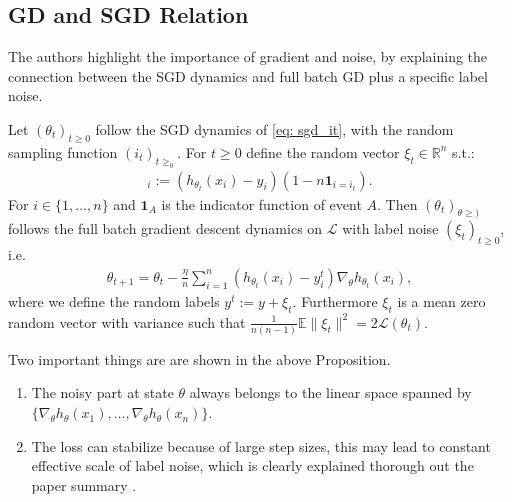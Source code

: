\subsection{GD and SGD Relation}
The authors highlight the importance of gradient and noise, by explaining the
connection between the SGD dynamics and full batch GD plus a specific label
noise.

\begin{proposition}
    Let $(\theta_t)_{t\ge 0 }$ follow the SGD dynamics of \ref{eq: sgd_it},
    with the random sampling function $(i_t)_{t\ge_0}$. For $t\ge 0$ define
    the random vector $\xi_t \in \mathbb{R}^{n}$ s.t.:
    \begin{align}
        [\xi_t]_i := (h_{\theta_t}(x_i) - y_i)(1-n\mathbf{1}_{i=i_t}).
    \end{align}
    For $i \in \{1,\ldots,n\}$ and $\mathbf{1}_{A}$ is the indicator function
    of event $A$. Then $(\theta_t)_{\theta\ge )}$ follows the full batch
    gradient descent dynamics on $\mathcal{L}$ with label noise
    $(\xi_t)_{t\ge 0}$, i.e.
    \begin{align}
        \theta_{t+1} = \theta_t - \frac{\eta}{n} \sum_{i=1}^{n}
        \left( h_{\theta_t}(x_i) - y_i^{t} \right)
        \nabla_{\theta}h_{\theta_t}(x_i),
    \end{align}
    where we define the random labels $y^{t} := y + \xi_t$. Furthermore
    $\xi_t$ is a mean zero random vector with variance such that
    $\frac{1}{n(n-1)}\mathbb{E}\|\xi_t\|^{2} = 2 \mathcal{L}(\theta_t)$.
\end{proposition}
Two important things are are shown in the above Proposition.
\begin{enumerate}
    \item The noisy part at state $\theta$ always belongs to the linear space
        spanned by $\{\nabla_\theta h_\theta(x_1),\ldots, \nabla_\theta
        h_\theta(x_n)\}$.

    \item The loss can stabilize because of large step sizes, this may lead
        to constant effective scale of label noise, which is clearly
        explained thorough out the paper summary \cite{andriushchenko2023sgd}.
\end{enumerate}
